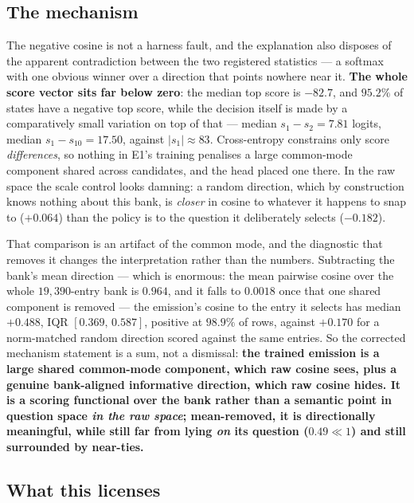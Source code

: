 \documentclass[11pt]{article}
\begin{document}
\subsection{The mechanism}

The negative cosine is not a harness fault, and the explanation also disposes of the apparent
contradiction between the two registered statistics --- a softmax with one obvious winner over a
direction that points nowhere near it. \textbf{The whole score vector sits far below zero}: the
median top score is $-82.7$, and $95.2\%$ of states have a negative top score, while the decision
itself is made by a comparatively small variation on top of that --- median $s_1 - s_2 = 7.81$
logits, median $s_1 - s_{10} = 17.50$, against $\lvert s_1\rvert \approx 83$. Cross-entropy
constrains only score \emph{differences}, so nothing in E1's training penalises a large common-mode
component shared across candidates, and the head placed one there. In the raw space the scale control
looks damning: a random direction, which by construction knows nothing about this bank, is
\emph{closer} in cosine to whatever it happens to snap to ($+0.064$) than the policy is to the
question it deliberately selects ($-0.182$).

That comparison is an artifact of the common mode, and the diagnostic that removes it changes the
interpretation rather than the numbers. Subtracting the bank's mean direction --- which is enormous:
the mean pairwise cosine over the whole $19{,}390$-entry bank is $0.964$, and it falls to $0.0018$
once that one shared component is removed --- the emission's cosine to the entry it selects has median
$\mathbf{+0.488}$, IQR $[0.369,\,0.587]$, positive at $98.9\%$ of rows, against $\mathbf{+0.170}$ for
a norm-matched random direction scored against the same entries. So the corrected mechanism statement
is a sum, not a dismissal: \textbf{the trained emission is a large shared common-mode component,
which raw cosine sees, plus a genuine bank-aligned informative direction, which raw cosine hides. It
is a scoring functional over the bank rather than a semantic point in question space \emph{in the raw
space}; mean-removed, it is directionally meaningful, while still far from lying \emph{on} its
question ($0.49 \ll 1$) and still surrounded by near-ties.}

\subsection{What this licenses}
\end{document}
